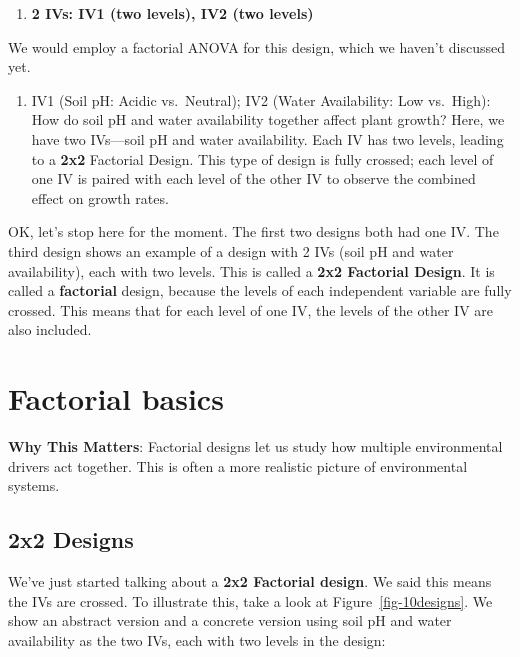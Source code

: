 \documentclass[
  letterpaper,
  DIV=11,
  numbers=noendperiod]{scrreprt}
\providecommand{\tightlist}{%
  \setlength{\itemsep}{0pt}\setlength{\parskip}{0pt}}
\begin{document}
\begin{enumerate}
\def\labelenumi{\arabic{enumi}.}
\setcounter{enumi}{2}
\tightlist
\item
  \textbf{2 IVs: IV1 (two levels), IV2 (two levels)}
\end{enumerate}

We would employ a factorial ANOVA for this design, which we haven't
discussed yet.

\begin{enumerate}
\def\labelenumi{\alph{enumi}.}
\tightlist
\item
  IV1 (Soil pH: Acidic vs.~Neutral); IV2 (Water Availability: Low
  vs.~High): How do soil pH and water availability together affect plant
  growth? Here, we have two IVs---soil pH and water availability. Each
  IV has two levels, leading to a \textbf{2x2} Factorial Design. This
  type of design is fully crossed; each level of one IV is paired with
  each level of the other IV to observe the combined effect on growth
  rates.
\end{enumerate}

OK, let's stop here for the moment. The first two designs both had one
IV. The third design shows an example of a design with 2 IVs (soil pH
and water availability), each with two levels. This is called a
\textbf{2x2 Factorial Design}. It is called a \textbf{factorial} design,
because the levels of each independent variable are fully crossed. This
means that for each level of one IV, the levels of the other IV are also
included.

\section{Factorial basics}\label{factorial-basics}

\textbf{Why This Matters}: Factorial designs let us study how multiple
environmental drivers act together. This is often a more realistic
picture of environmental systems.

\subsection{2x2 Designs}\label{x2-designs}

We've just started talking about a \textbf{2x2 Factorial design}. We
said this means the IVs are crossed. To illustrate this, take a look at
Figure~\ref{fig-10designs}. We show an abstract version and a concrete
version using soil pH and water availability as the two IVs, each with
two levels in the design:
\end{document}
